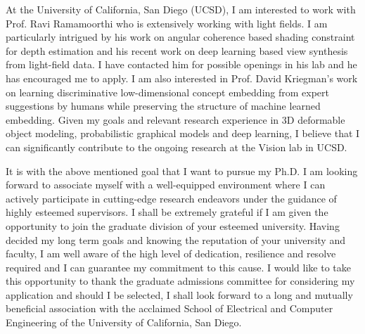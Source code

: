 \documentclass{article}
\begin{document}
	\vspace{0.2cm}
	
	At the University of California, San Diego (UCSD), I am interested to work with Prof. Ravi Ramamoorthi who is extensively working with light fields. I am particularly intrigued by his work on angular coherence based shading constraint for depth estimation and his recent work on deep learning based view synthesis from light-field data. I have contacted him for possible openings in his lab and he has encouraged me to apply. I am also interested in Prof. David Kriegman's work on learning discriminative low-dimensional concept embedding from expert suggestions by humans while preserving the structure of machine learned embedding. Given my goals and relevant research experience in 3D deformable object modeling, probabilistic graphical models and deep learning, I believe that I can significantly contribute to the ongoing research at the Vision lab in UCSD.
	
	\vspace{0.2cm}
	
	It is with the above mentioned goal that I want to pursue my Ph.D. I am looking forward to associate myself with a well-equipped environment where I can actively participate in cutting-edge research endeavors under the guidance of highly esteemed supervisors. I shall be extremely grateful if I am given the opportunity to join the graduate division of your esteemed university. Having decided my long term goals and knowing the reputation of your university and faculty, I am well aware of the high level of dedication, resilience and resolve required and I can guarantee my commitment to this cause. I would like to take this opportunity to thank the graduate admissions committee for considering my application and should I be selected, I shall look forward to a long and mutually beneficial association with the acclaimed School of Electrical and Computer Engineering of the University of California, San Diego.
	
\end{document}
